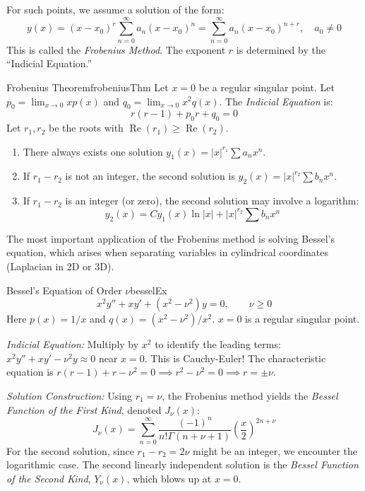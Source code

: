 \documentclass{book}
\renewcommand{\Re}{{\operatorname{Re}}}
\begin{document}
For such points, we assume a solution of the form:
\[
    y(x) = (x-x_0)^r \sum_{n=0}^\infty a_n (x-x_0)^n = \sum_{n=0}^\infty a_n (x-x_0)^{n+r}, \quad a_0 \ne 0
\]
This is called the \emph{Frobenius Method}. The exponent $r$ is determined by the ``Indicial Equation.''

\begin{thm}{Frobenius Theorem}{frobeniusThm}
    Let $x=0$ be a regular singular point. Let $p_0 = \lim_{x \to 0} xp(x)$ and $q_0 = \lim_{x \to 0} x^2q(x)$. The \emph{Indicial Equation} is:
    \[
        r(r-1) + p_0 r + q_0 = 0
    \]
    Let $r_1, r_2$ be the roots with $\Re(r_1) \ge \Re(r_2)$.
    \begin{enumerate}
        \item There always exists one solution $y_1(x) = |x|^{r_1} \sum a_n x^n$.
        \item If $r_1 - r_2$ is not an integer, the second solution is $y_2(x) = |x|^{r_2} \sum b_n x^n$.
        \item If $r_1 - r_2$ is an integer (or zero), the second solution may involve a logarithm:
        \[
            y_2(x) = C y_1(x) \ln|x| + |x|^{r_2} \sum b_n x^n
        \]
    \end{enumerate}
\end{thm}


The most important application of the Frobenius method is solving Bessel's equation, which arises when separating variables in cylindrical coordinates (Laplacian in 2D or 3D).

\begin{example}{Bessel's Equation of Order $\nu$}{besselEx}
    \[
        x^2 y'' + x y' + (x^2 - \nu^2)y = 0, \qquad \nu \ge 0
    \]
    Here $p(x) = 1/x$ and $q(x) = (x^2-\nu^2)/x^2$. $x=0$ is a regular singular point.

    \emph{Indicial Equation:}
    Multiply by $x^2$ to identify the leading terms: $x^2 y'' + xy' - \nu^2 y \approx 0$ near $x=0$. This is Cauchy-Euler!
    The characteristic equation is $r(r-1) + r - \nu^2 = 0 \implies r^2 - \nu^2 = 0 \implies r = \pm \nu$.

    \emph{Solution Construction:}
    Using $r_1 = \nu$, the Frobenius method yields the \emph{Bessel Function of the First Kind}, denoted $J_\nu(x)$:
    \[
        J_\nu(x) = \sum_{n=0}^\infty \frac{(-1)^n}{n! \Gamma(n+\nu+1)} \left(\frac{x}{2}\right)^{2n+\nu}
    \]
    For the second solution, since $r_1 - r_2 = 2\nu$ might be an integer, we encounter the logarithmic case. The second linearly independent solution is the \emph{Bessel Function of the Second Kind}, $Y_\nu(x)$, which blows up at $x=0$.
\end{example}
\end{document}
